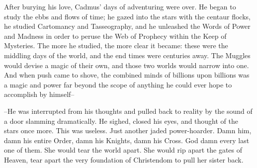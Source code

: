 After burying his love, Cadmus’ days of adventuring were over. He began to study the ebbs and flows of time; he gazed into the stars with the centaur flocks, he studied Cartomancy and Tasseography, and he unleashed the Words of Power and Madness in order to peruse the Web of Prophecy within the Keep of Mysteries. The more he studied, the more clear it became: these were the middling days of the world, and the end times were centuries away. The Muggles would devise a magic of their own, and those two worlds would narrow into one. And when push came to shove, the combined minds of billions upon billions was a magic and power far beyond the scope of anything he could ever hope to accomplish by himself–

–He was interrupted from his thoughts and pulled back to reality by the sound of a door slamming dramatically. He sighed, closed his eyes, and thought of the stars once more.
\simpleline
This was useless. Just another jaded power-hoarder. Damn him, damn his entire Order, damn his Knights, damn his Cross. God damn every last one of them. She would tear the world apart. She would rip apart the gates of Heaven, tear apart the very foundation of Christendom to pull her sister back.


